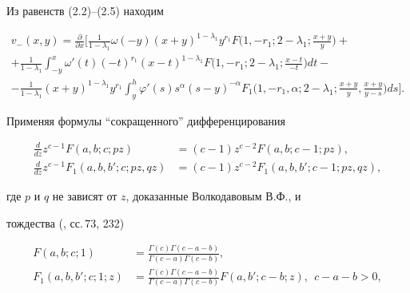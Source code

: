  


Из равенств (2.2)--(2.5) находим 


\begin{multline*} 


v_-(x,y)=\frac{\partial}{\partial x}\bigg[\frac{1}{1-\lambda_1} 


\omega(-y)(x+y)^{1-\lambda_1}y^{r_1}F\bigg(1,-r_1;2-\lambda_1; 


\frac{x+y}{y}\bigg)+ \\


+ \frac{1}{1-\lambda_1}\int^x_{-y} 


\omega'(t)(-t)^{r_1}(x-t)^{1-\lambda_1}


F\bigg(1,-r_1;2-\lambda_1;\frac{x-t}{-t}\bigg)d t- \\


%


-\frac{1}{1-\lambda_1}(x+y)^{1-\lambda_1}y^{r_1}\int^h_y 


\varphi'(s)s^\alpha(s-y)^{-\alpha}F_1\bigg(1,-r_1,\alpha;2-\lambda_1; 


\frac{x+y}{y},\frac{x+y}{y-s}\bigg)d s\bigg]. 


\end{multline*} 


Применяя формулы ``сокращенного'' дифференцирования 


\begin{align*} 


\frac{d}{d z}z^{c-1}F(a,b;c;p z)&=(c-1)z^{c-2}F(a,b;c-1;p z),\\ 


\frac{d}{d z}z^{c-1}F_1(a,b,b';c;p z,q z)&=(c-1)z^{c-2} 


F_1(a,b,b';c-1;p z,q z), 


\end{align*} 


где $p$ и $q$ не зависят от $z$, доказанные Волкодавовым В.Ф., и 


тождества (\cite{2}, сс.\,73, 232) 


\begin{align*} 


F(a,b;c;1)&=\frac{\Gamma(c)\Gamma(c-a-b)}{\Gamma(c-a)\Gamma(c-b)},\\ 


% 


F_1(a,b,b';c;1;z)&=\frac{\Gamma(c)\Gamma(c-a-b)} 


{\Gamma(c-a)\Gamma(c-b)}F(a,b';c-b;z),\ \ c-a-b>0, 


\end{align*} 


